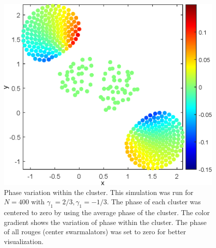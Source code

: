 \documentclass[superscriptaddress,reprint,amssymb, amsmath,aps, pre]{revtex4-1}
\begin{document}
{    \begin{figure}[h!]
        \includegraphics[width = \linewidth]{phaseVar.eps}
        \caption{Phase variation within the cluster. This simulation was run for \(N = 400\) with \(\gamma_1 = 2/3,\gamma_1 = -1/3\). The phase of each cluster was centered to zero by using the average phase of the cluster. The color gradient shows the variation of phase within the cluster. The phase of all rouges (center swarmalators) was set to zero for better visualization. }
        \label{fig:phaseVar}
    \end{figure}
}
\noindent

\end{document}
